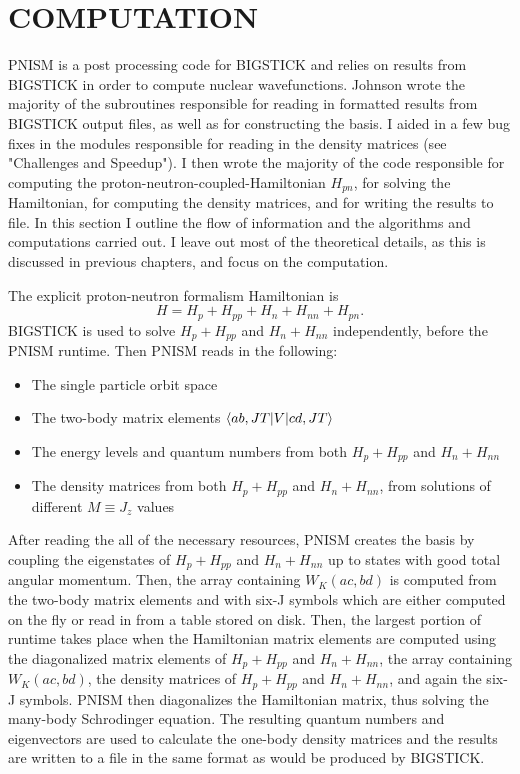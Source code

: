\chapter{COMPUTATION}
\label{chap:computation}

PNISM is a post processing code for BIGSTICK and relies on results from BIGSTICK
in order to compute nuclear wavefunctions. Johnson wrote the majority of the 
subroutines responsible for reading 
in formatted results from BIGSTICK output files, as well as for constructing the 
basis. I aided in a few bug fixes in the modules responsible for reading in the density matrices
(see "Challenges and Speedup"). I then wrote the majority of the code responsible
for computing the proton-neutron-coupled-Hamiltonian $H_{pn}$, for solving the
Hamiltonian, for computing the density matrices, and for writing the results to file.
In this section I outline the flow of information and the algorithms and 
computations carried out. I leave out most of the theoretical details, as this 
is discussed in previous chapters, and focus on the computation.

The explicit proton-neutron formalism Hamiltonian is
\begin{equation}
    H = H_p + H_{pp} + H_n + H_{nn} + H_{pn}.
\end{equation}
BIGSTICK is used to solve $H_p + H_{pp}$ and $H_n + H_{nn}$ independently, before the 
PNISM runtime. Then PNISM reads in the following:
\begin{itemize}[nolistsep]
    \item The single particle orbit space 
    \item The two-body matrix elements $\langle ab,JT|V|cd,JT\rangle$
    \item The energy levels and quantum numbers from both $H_p + H_{pp}$ and $H_n + H_{nn}$
    \item The density matrices from both $H_p + H_{pp}$ and $H_n + H_{nn}$,
        from solutions of different $M\equiv J_z$ values
\end{itemize}
After reading the all of the necessary resources, PNISM creates the basis by
coupling the eigenstates of $H_p + H_{pp}$ and $H_n + H_{nn}$ up to states with
good total angular momentum. Then, the array containing $W_K(ac,bd)$ is computed
from the two-body matrix elements and with six-J symbols which are either computed
on the fly or read in from a table stored on disk. Then, the largest portion of 
runtime takes place when the Hamiltonian matrix elements are computed using the
diagonalized matrix elements of $H_p + H_{pp}$ and $H_n + H_{nn}$, the 
array containing $W_K(ac,bd)$, the density matrices of $H_p + H_{pp}$ and $H_n + H_{nn}$,
and again the six-J symbols. PNISM then diagonalizes the Hamiltonian matrix,
thus solving the many-body Schrodinger equation. The resulting quantum numbers
and eigenvectors are used to calculate the one-body density matrices and the
results are written to a file in the same format as would be produced by BIGSTICK.


